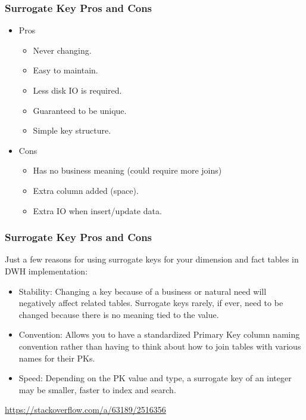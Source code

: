 \begin{frame}
	\frametitle{Surrogate Key Pros and Cons}

\hspace{.5cm}
\begin{itemize}
	\item	Pros
	\begin{itemize}
		\item Never changing.
		\item Easy to maintain.
		\item Less disk IO is required.
		\item Guaranteed to be unique.
		\item Simple key structure.
	\end{itemize}	
\end{itemize}

\begin{itemize}
	\item	Cons
	\begin{itemize}
		\item Has no business meaning (could require more joins)
		\item Extra column added (space).
		\item Extra IO when insert/update data.
	\end{itemize}	
\end{itemize}	
\end{frame}

\begin{frame}
\frametitle{Surrogate Key Pros and Cons}
\vspace{.5cm}
Just a few reasons for using surrogate keys for your dimension and fact tables in DWH implementation:
	\begin{itemize}[<+->]
	\item Stability: Changing a key because of a business or natural need will negatively affect related tables. Surrogate keys rarely, if ever, need to be changed because there is no meaning tied to the value.
	
	\item Convention: Allows you to have a standardized Primary Key column naming convention rather than having to think about how to join tables with various names for their PKs.
	
	\item Speed: Depending on the PK value and type, a surrogate key of an integer may be smaller, faster to index and search.
	
\end{itemize}	

\href{https://stackoverflow.com/a/63189/2516356}{https://stackoverflow.com/a/63189/2516356}

\end{frame}